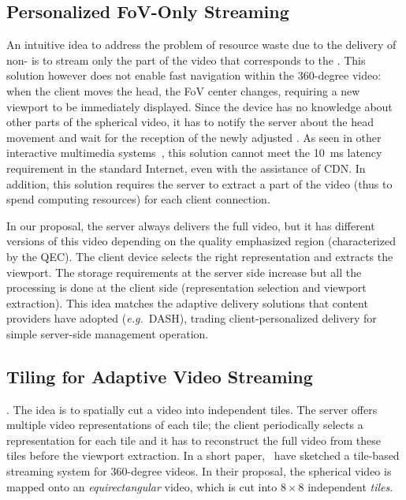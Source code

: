 \subsection{Personalized FoV-Only Streaming}

An intuitive idea to address the problem of resource waste due to the
delivery of non- is to stream only the part of the video that
corresponds to the . This solution however does not enable
fast navigation within the 360-degree video: when the client moves the
head, the FoV center changes, requiring a new viewport to be
immediately displayed. Since the device has no knowledge about other
parts of the spherical video, it has to notify the server about the
head movement and wait for the reception of the newly adjusted . 
As seen in other interactive multimedia
systems~\cite{ChoyWSR14}, this solution cannot meet the \SI{10}{ms} latency
requirement in the standard Internet, even with the assistance of
\ac{CDN}. In addition, this solution requires the server to extract a
part of the video (thus to spend computing resources) for each client
connection.

In our proposal, the server always delivers
the full video, but it has different versions of this video depending
on the quality emphasized region (characterized by the QEC). The client device
selects the right representation and extracts the viewport. The
storage requirements at the server side increase but all the
processing is done at the client side (representation selection and
viewport extraction). This idea matches the adaptive delivery
solutions that content providers have  adopted %
(\textit{e.g.}~\ac{DASH}), trading client-personalized delivery for
simple server-side management operation.

\subsection{Tiling for Adaptive Video Streaming}
.
The idea is to
spatially cut a video into independent tiles. The server offers
multiple video representations of each tile; the client periodically
selects a representation for each tile and it has to reconstruct the
full video from these tiles before the viewport extraction.
In a short paper,~\citet{ochi_live_2015} have sketched a
tile-based streaming system for 360-degree videos. In their proposal,
the spherical video is mapped onto an \emph{equirectangular} video,
which is cut into $8\!\times\! 8$ independent \emph{tiles}.

